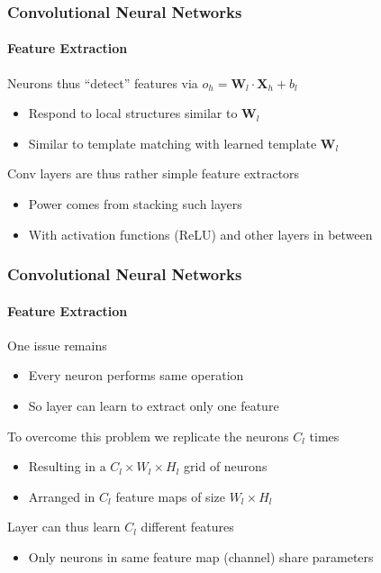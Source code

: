 \documentclass[xetex,professionalfont]{beamer}
\renewcommand\emph[1]{\textcolor{tuwcvl_cvl_blue}{#1}}
\renewcommand{\vec}[1]{\ensuremath{\mathbf{#1}}}
\newcommand{\vW}{\vec{W}}
\newcommand{\vX}{\vec{X}}
\begin{document}
\begin{frame}
\frametitle{Convolutional Neural Networks}
\framesubtitle{Feature Extraction}

Neurons thus \enquote{detect} features via $o_h=\vW_l\cdot\vX_h+b_l$
\begin{itemize}
    \item Respond to local structures similar to $\vW_l$
    \item Similar to template matching with \emph{learned template} $\vW_l$
\end{itemize}

\bigskip

Conv layers are thus rather simple feature extractors
\begin{itemize}
    \item Power comes from stacking such layers %
    \item With activation functions (ReLU) and other layers in between
\end{itemize}

\end{frame}


\begin{frame}
\frametitle{Convolutional Neural Networks}
\framesubtitle{Feature Extraction}

One issue remains
\begin{itemize}
    \item Every neuron performs same operation
    \item So layer can learn to extract only one feature
\end{itemize}

\bigskip

To overcome this problem we replicate the neurons $C_l$ times
\begin{itemize}
    \item Resulting in a $C_l\times W_l\times H_l$ grid of neurons
    \item Arranged in $C_l$ \emph{feature maps} of size $W_l\times H_l$
\end{itemize}

\bigskip

Layer can thus learn $C_l$ different features
\begin{itemize}
    \item Only neurons in same feature map (channel) share parameters
\end{itemize}

\end{frame}
\end{document}
